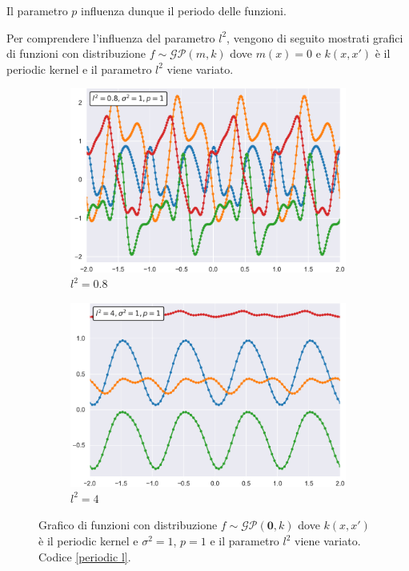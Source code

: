 Il parametro $p$ influenza dunque il periodo delle funzioni.

Per comprendere l'influenza del parametro $l^2$, vengono di seguito mostrati grafici di funzioni con distribuzione $f\sim \mathcal{GP}(m,k)$ dove $m(x)=0$ e $k(x,x')$ è il periodic kernel e il parametro $l^2$ viene variato.

\begin{figure}[h]
\centering
\begin{subfigure}{.5\textwidth}
  \centering
  \includegraphics[width=\linewidth]{images/Gaussian process/Periodic - l=0.8.pdf}
  \caption{$l^2=0.8$}
\end{subfigure}%
\begin{subfigure}{.5\textwidth}
  \centering
  \includegraphics[width=\linewidth]{images/Gaussian process/Periodic - l=4.pdf}
  \caption{$l^2=4$}
\end{subfigure}
\caption{Grafico di funzioni con distribuzione  $f\sim \mathcal{GP}(\bm{0},k)$ dove $k(x,x')$ è il periodic kernel e $\sigma^2=1$, $p=1$ e il parametro $l^2$ viene variato. Codice \ref{periodic l}.}
\label{10 sample periodic modified l}
\end{figure}

